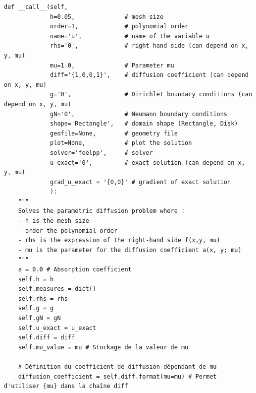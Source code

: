 \documentclass{article}
\begin{document}
\begin{verbatim}
def __call__(self,
             h=0.05,              # mesh size
             order=1,             # polynomial order
             name='u',            # name of the variable u
             rhs='0',             # right hand side (can depend on x, y, mu)
             mu=1.0,              # Parameter mu
             diff='{1,0,0,1}',    # diffusion coefficient (can depend on x, y, mu)
             g='0',               # Dirichlet boundary conditions (can depend on x, y, mu)
             gN='0',              # Neumann boundary conditions
             shape='Rectangle',   # domain shape (Rectangle, Disk)
             geofile=None,        # geometry file
             plot=None,           # plot the solution
             solver='feelpp',     # solver
             u_exact='0',         # exact solution (can depend on x, y, mu)
             grad_u_exact = '{0,0}' # gradient of exact solution
             ):
    """
    Solves the parametric diffusion problem where :
    - h is the mesh size
    - order the polynomial order
    - rhs is the expression of the right-hand side f(x,y, mu)
    - mu is the parameter for the diffusion coefficient a(x, y; mu)
    """
    a = 0.0 # Absorption coefficient
    self.h = h
    self.measures = dict()
    self.rhs = rhs
    self.g = g
    self.gN = gN
    self.u_exact = u_exact
    self.diff = diff
    self.mu_value = mu # Stockage de la valeur de mu

    # Définition du coefficient de diffusion dépendant de mu
    diffusion_coefficient = self.diff.format(mu=mu) # Permet d'utiliser {mu} dans la chaîne diff


\end{verbatim}
\end{document}
